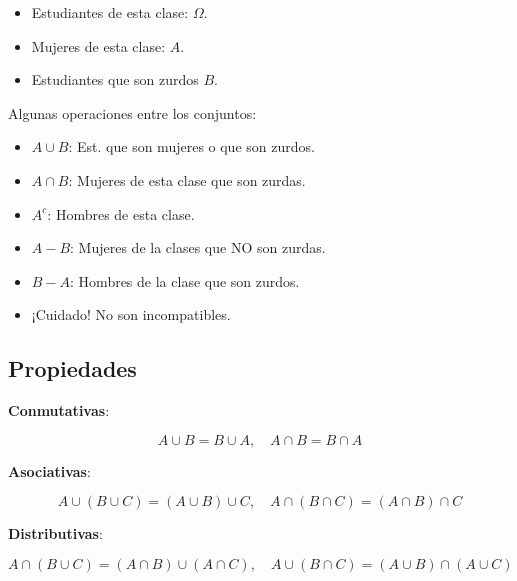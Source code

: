 \documentclass[]{book}
\providecommand{\tightlist}{%
  \setlength{\itemsep}{0pt}\setlength{\parskip}{0pt}}
\begin{document}
\begin{itemize}
\tightlist
\item
  Estudiantes de esta clase: \(\Omega\).
\item
  Mujeres de esta clase: \(A\).
\item
  Estudiantes que son zurdos \(B\).
\end{itemize}

Algunas operaciones entre los conjuntos:

\begin{itemize}
\tightlist
\item
  \(A\cup B\): Est. que son mujeres o que son zurdos.
\item
  \(A\cap B\): Mujeres de esta clase que son zurdas.
\item
  \(A^c\): Hombres de esta clase.
\item
  \(A-B\): Mujeres de la clases que NO son zurdas.
\item
  \(B-A\): Hombres de la clase que son zurdos.
\item
  ¡Cuidado! No son incompatibles.
\end{itemize}

\hypertarget{propiedades}{%
\subsection{Propiedades}\label{propiedades}}

\textbf{Conmutativas}:

\[A\cup B=B\cup A, \quad A\cap B=B\cap A\]

\textbf{Asociativas}:

\[A\cup(B\cup C)=(A\cup B)\cup C, \quad A\cap(B\cap C)=(A\cap B)\cap C\]

\textbf{Distributivas}:

\[A\cap(B\cup C)=(A\cap B)\cup (A\cap C), \quad A\cup(B\cap C)=(A\cup B)\cap (A\cup C)\]
\end{document}
